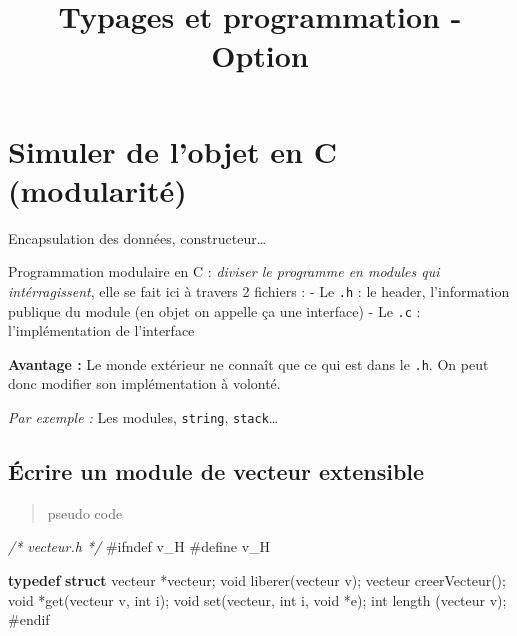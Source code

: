 \documentclass[]{article}
\date{}
\newenvironment{Shaded}{}{}
\newcommand{\KeywordTok}[1]{\textcolor[rgb]{0.00,0.44,0.13}{\textbf{#1}}}
\newcommand{\DataTypeTok}[1]{\textcolor[rgb]{0.56,0.13,0.00}{#1}}
\newcommand{\CommentTok}[1]{\textcolor[rgb]{0.38,0.63,0.69}{\textit{#1}}}
\newcommand{\PreprocessorTok}[1]{\textcolor[rgb]{0.74,0.48,0.00}{#1}}
\newcommand{\NormalTok}[1]{#1}
\begin{document}
\title{Typages et programmation - Option}

\maketitle

\section{Simuler de l'objet en C
(modularité)}\label{simuler-de-lobjet-en-c-modularituxe9}

Encapsulation des données, constructeur\ldots{}

Programmation modulaire en C : \emph{diviser le programme en modules qui
intérragissent}, elle se fait ici à travers 2 fichiers : - Le
\texttt{.h} : le header, l'information publique du module (en objet on
appelle ça une interface) - Le \texttt{.c} : l'implémentation de
l'interface

\textbf{Avantage :} Le monde extérieur ne connaît que ce qui est dans le
\texttt{.h}. On peut donc modifier son implémentation à volonté.

\emph{Par exemple :} Les modules, \texttt{string},
\texttt{stack}\ldots{}

\subsection{Écrire un module de vecteur
extensible}\label{uxe9crire-un-module-de-vecteur-extensible}

\begin{quote}
pseudo code
\end{quote}

\begin{Shaded}
\begin{Highlighting}[]
\CommentTok{/* vecteur.h */}
\PreprocessorTok{#ifndef v_H}
\PreprocessorTok{#define v_H}

\KeywordTok{typedef} \KeywordTok{struct}\NormalTok{ vecteur *vecteur;}
\DataTypeTok{void}\NormalTok{ liberer(vecteur v);}
\NormalTok{vecteur creerVecteur();}
\DataTypeTok{void}\NormalTok{ *get(vecteur v, }\DataTypeTok{int}\NormalTok{ i);}
\DataTypeTok{void}\NormalTok{ set(vecteur, }\DataTypeTok{int}\NormalTok{ i, }\DataTypeTok{void}\NormalTok{ *e);}
\DataTypeTok{int}\NormalTok{ length (vecteur v);}
\PreprocessorTok{#endif}
\end{Highlighting}
\end{Shaded}
\end{document}
